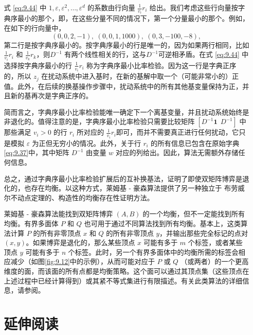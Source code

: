 式 \eqref{eq:9.44} 中 \(1,\varepsilon,{\varepsilon }^{2},\ldots,{\varepsilon }^{d}\) 的系数由行向量 \(\frac{1}{{v}_{i}}{r}_{i}\) 给出。我们考虑这些行向量按字典序最小的那个，即，在这些分量不同的情况下，第一个分量最小的那个。例如，在如下的行向量中，
\[
\left( {0,0,2, - 1}\right),\;\left( {0,0,1,{1000}}\right),\;\left( {0,3, - {100}, - 8}\right),
\]
第二行是按字典序最小的。按字典序最小的行是唯一的，因为如果两行相同，比如 \(\frac{1}{{v}_{i}}{r}_{i}\) 和 \(\frac{1}{{v}_{k}}{r}_{k}\)，则\({D}^{-1}\) 有两个线性相关的行，这与\({D}^{-1}\)可逆相矛盾。在式 \eqref{eq:9.44} 中选择按字典序最小的行 \(\frac{1}{{v}_{i}}{r}_{i}\) 称为字典序最小比率检验。因为这一行是字典正序的，所以 \({z}_{j}\) 在扰动系统中进入基时，在新的基解中取一个（可能非常小的）正值。此外，在后续的换基操作步骤中，扰动系统中的所有其他基变量保持为正，并且新的基再次是字典正序的。

简而言之，字典序最小比率检验能唯一确定下一个离基变量，并且扰动系统始终是非退化的。值得注意的是，字典序最小比率检验只需要比较矩阵 \(\left\lbrack {D}^{-1}\mathbf{1} ~~{D}^{-1}\right\rbrack\) 中那些满足 \({v}_{i} > 0\) 的行 \({r}_{i}\) 所对应的 \(\frac{1}{{v}_{i}}{r}_{i}\)即可，而并不需要真正进行任何扰动，它只是模拟 \(\varepsilon\) 为正但无穷小的情况。此外，关于行 \({r}_{i}\) 的所有信息已包含在原始字典\eqref{eq:9.37}中，其中矩阵 \({D}^{-1}\) 由变量 \(w\) 对应的列给出。因此，算法无需额外存储任何信息。


总之，通过字典序最小比率检验扩展后的互补换基法，证明了即使双矩阵博弈是退化的，也存在均衡。以这种方式，莱姆基 - 豪森算法提供了另一种独立于 布劳威尔不动点定理的、构造性的均衡存在性证明方法。


莱姆基 - 豪森算法能找到双矩阵博弈 $(A, B)$ 的一个均衡，但不一定能找到所有均衡。有界多面体 \(P\) 和 \(Q\) 也可用于通过不同算法找到所有均衡。基本上，这类算法计算 \(P\) 的所有非零顶点 \(x\) 和 \(Q\) 的所有非零顶点 \(y\)，并输出那些完全标记的点对 $(x, y)$。如果博弈是退化的，那么某些顶点 \(x\) 可能有多于 \(m\) 个标签，或者某些顶点 \(y\) 可能有多于 \(n\) 个标签。此时，另一个有界多面体中的均衡所需的标签会相应减少（如图\ref{fig:9.12}中的示例），从而可能对应于 \(P\) 或 \(Q\) （或两者）的一个更高维度的面，而该面的所有点都是均衡策略。这个面可以通过其顶点集（这些顶点在上述过程中已经计算得到）或其紧不等式集进行有限描述。有关此类算法的详细信息，请参阅\citet*{avis2010}。


\section{延伸阅读}   \label{sec9.9}


